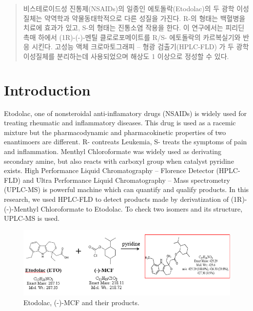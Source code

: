 \documentclass[12pt]{article} %
\begin{document}
\renewcommand\abstractname{초\hskip6mm 록}
\begin{abstract}
  비스테로이드성 진통제(NSAIDs)의 일종인 에토돌락(Etodolac)의 두 광학 이성질체는 약역학과 약물동태학적으로 다른 성질을 가진다. R-의 형태는 백혈병을 치료에 효과가 있고, S-의 형태는 진통소염 작용을 한다. 이 연구에서는 피리딘 촉매 하에서 (1R)-(-)-멘틸 클로로포메이트를 R/S- 에토돌락의 카르복실기와 반응 시킨다. 고성능 액체 크로마토그래피 – 형광 검출기(HPLC-FLD) 가 두 광학 이성질체를 분리하는데 사용되었으며 해상도 1 이상으로 정성할 수 있다.

\end{abstract}

\newpage

\tableofcontents

\newpage

\listoffigures

\newpage

\listoftables

\newpage



\setcounter{page}{1}

\section{Introduction}

Etodolac, one of nonsteroidal anti-inflamatory drugs (NSAIDs) is widely used for treating rheumatic and inflammatory diseases. This drug is used as a racemic mixture but the pharmacodynamic and pharmacokinetic properties of two enantimoers are different. R- contreats Leukemia\cite{cite1}, S- treats the symptoms of pain and inflammation. Menthyl Chloroformate was widely used as derivating secondary amine, but also reacts with carboxyl group when catalyst pyridine exists.
High Performance Liquid Chromatography – Florence Detector (HPLC-FLD) and Ultra Performance Liquid Chromatography – Mass spectrometry (UPLC-MS) is powerful machine which can quantify and qualify products. 
In this research, we used HPLC-FLD to detect products made by derivatization of (1R)-(-)-Menthyl Chloroformate to Etodolac. To check two isomers and its structure, UPLC-MS is used.


\begin{figure}[h]
  \includegraphics[width=\linewidth]{fig1.png}
  \caption{Etodolac, (-)-MCF and their products.}
  \label{fig:fig1}
\end{figure}
\end{document}
